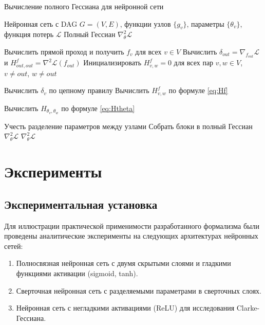 \documentclass[11pt]{article}
\newcommand{\Ch}{\mathrm{Ch}} %
\begin{document}
\begin{algorithm}
  \caption{Вычисление полного Гессиана для нейронной сети}
  \begin{algorithmic}[1]
    \Require Нейронная сеть с DAG $G=(V,E)$, функции узлов $\{g_v\}$, параметры $\{\theta_v\}$, функция
    потерь $\mathcal{L}$
    \Ensure Полный Гессиан $\nabla^2_\theta \mathcal{L}$

    \State Вычислить прямой проход и получить $f_v$ для всех $v \in V$
    \State Вычислить $\delta_{out} = \nabla_{f_{out}} \mathcal{L}$ и $H^f_{out,out} = \nabla^2 \mathcal{L}(f_{out})$
    \State Инициализировать $H^f_{v,w} = 0$ для всех пар $v,w \in V$, $v \neq out$, $w \neq out$

    \State Вычислить $\delta_v$ по цепному правилу
    \For{$w \in V$ такие, что $\Ch(v) \cap \Ch(w) \neq \emptyset$}
    \State Вычислить $H^f_{v,w}$ по формуле \eqref{eq:Hf}
    \EndFor
    \EndFor

    \State Вычислить $H_{\theta_v, \theta_w}$ по формуле \eqref{eq:Htheta}
    \EndFor
    \EndFor

    \State Учесть разделение параметров между узлами
    \State Собрать блоки в полный Гессиан $\nabla^2_\theta \mathcal{L}$
    \State \Return $\nabla^2_\theta \mathcal{L}$
  \end{algorithmic}
\end{algorithm}

\section{Эксперименты}

\subsection{Экспериментальная установка}

Для иллюстрации практической применимости разработанного формализма были проведены аналитические эксперименты
на следующих архитектурах нейронных сетей:

\begin{enumerate}
  \item Полносвязная нейронная сеть с двумя скрытыми слоями и гладкими функциями активации (sigmoid, tanh).
  \item Сверточная нейронная сеть с разделяемыми параметрами в сверточных слоях.
  \item Нейронная сеть с негладкими активациями (ReLU) для исследования Clarke-Гессиана.
\end{enumerate}
\end{document}

